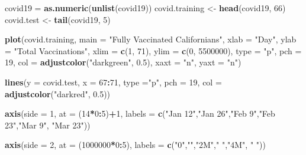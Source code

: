\documentclass[]{article}
\newenvironment{Shaded}{\begin{snugshade}}{\end{snugshade}}
\newcommand{\DataTypeTok}[1]{\textcolor[rgb]{0.13,0.29,0.53}{#1}}
\newcommand{\DecValTok}[1]{\textcolor[rgb]{0.00,0.00,0.81}{#1}}
\newcommand{\FloatTok}[1]{\textcolor[rgb]{0.00,0.00,0.81}{#1}}
\newcommand{\KeywordTok}[1]{\textcolor[rgb]{0.13,0.29,0.53}{\textbf{#1}}}
\newcommand{\NormalTok}[1]{#1}
\newcommand{\OperatorTok}[1]{\textcolor[rgb]{0.81,0.36,0.00}{\textbf{#1}}}
\newcommand{\StringTok}[1]{\textcolor[rgb]{0.31,0.60,0.02}{#1}}
\begin{document}
\begin{Shaded}
\begin{Highlighting}[]
\NormalTok{covid19 =}\StringTok{ }\KeywordTok{as.numeric}\NormalTok{(}\KeywordTok{unlist}\NormalTok{(covid19))}
\NormalTok{covid.training <-}\StringTok{ }\KeywordTok{head}\NormalTok{(covid19, }\DecValTok{66}\NormalTok{)}
\NormalTok{covid.test <-}\StringTok{ }\KeywordTok{tail}\NormalTok{(covid19, }\DecValTok{5}\NormalTok{)}

\KeywordTok{plot}\NormalTok{(covid.training,}
     \DataTypeTok{main =} \StringTok{"Fully Vaccinated Californians"}\NormalTok{,}
     \DataTypeTok{xlab =} \StringTok{"Day"}\NormalTok{,}
     \DataTypeTok{ylab =} \StringTok{"Total Vaccinations"}\NormalTok{,}
     \DataTypeTok{xlim =} \KeywordTok{c}\NormalTok{(}\DecValTok{1}\NormalTok{, }\DecValTok{71}\NormalTok{),}
     \DataTypeTok{ylim =} \KeywordTok{c}\NormalTok{(}\DecValTok{0}\NormalTok{, }\DecValTok{5500000}\NormalTok{),}
     \DataTypeTok{type =} \StringTok{"p"}\NormalTok{,}
     \DataTypeTok{pch =} \DecValTok{19}\NormalTok{,}
     \DataTypeTok{col =} \KeywordTok{adjustcolor}\NormalTok{(}\StringTok{"darkgreen"}\NormalTok{, }\FloatTok{0.5}\NormalTok{),}
     \DataTypeTok{xaxt =} \StringTok{"n"}\NormalTok{,}
     \DataTypeTok{yaxt =} \StringTok{"n"}\NormalTok{)}

\KeywordTok{lines}\NormalTok{(}\DataTypeTok{y =}\NormalTok{ covid.test,}
      \DataTypeTok{x =} \DecValTok{67}\OperatorTok{:}\DecValTok{71}\NormalTok{,}
      \DataTypeTok{type =}\StringTok{"p"}\NormalTok{,}
      \DataTypeTok{pch =} \DecValTok{19}\NormalTok{,}
      \DataTypeTok{col =} \KeywordTok{adjustcolor}\NormalTok{(}\StringTok{"darkred"}\NormalTok{, }\FloatTok{0.5}\NormalTok{))}

\KeywordTok{axis}\NormalTok{(}\DataTypeTok{side =} \DecValTok{1}\NormalTok{, }\DataTypeTok{at =}\NormalTok{ (}\DecValTok{14}\OperatorTok{*}\DecValTok{0}\OperatorTok{:}\DecValTok{5}\NormalTok{)}\OperatorTok{+}\DecValTok{1}\NormalTok{, }\DataTypeTok{labels =} \KeywordTok{c}\NormalTok{(}\StringTok{"Jan 12"}\NormalTok{,}\StringTok{"Jan 26"}\NormalTok{,}\StringTok{"Feb 9"}\NormalTok{,}\StringTok{"Feb 23"}\NormalTok{,}\StringTok{"Mar 9"}\NormalTok{, }\StringTok{"Mar 23"}\NormalTok{))}

\KeywordTok{axis}\NormalTok{(}\DataTypeTok{side =} \DecValTok{2}\NormalTok{, }\DataTypeTok{at =}\NormalTok{ (}\DecValTok{1000000}\OperatorTok{*}\DecValTok{0}\OperatorTok{:}\DecValTok{5}\NormalTok{), }\DataTypeTok{labels =} \KeywordTok{c}\NormalTok{(}\StringTok{"0"}\NormalTok{,}\StringTok{""}\NormalTok{,}\StringTok{"2M"}\NormalTok{,}\StringTok{" "}\NormalTok{,}\StringTok{"4M"}\NormalTok{, }\StringTok{" "}\NormalTok{))}


\end{Highlighting}
\end{Shaded}
\end{document}
